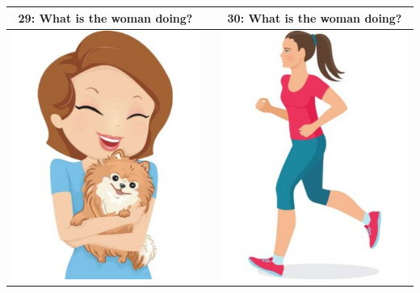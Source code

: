 \documentclass[12pt,notitlepage]{article}
\begin{document}
\begin{center}
\begin{tabular}{|c|c|c|}
\hline
29: What is the woman doing? && 30: What is the woman doing? \\
\hline
\includegraphics[width=20em,trim=0 0 0 -3]{figures/I29.jpg} & & \includegraphics[width=20em,trim=0 0 0 -3]{figures/I30.jpg} \\
\hline
\end{tabular}
\end{center}
\end{document}
